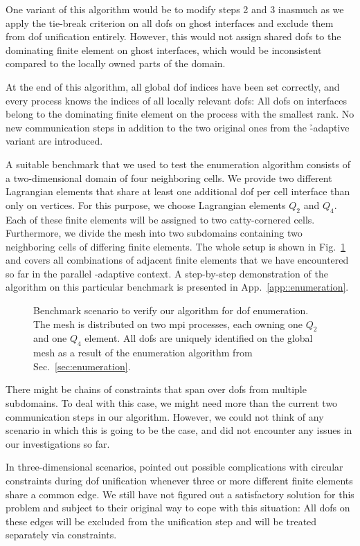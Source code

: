 One variant of this algorithm would be to modify steps 2 and 3 inasmuch as we apply the tie-break criterion on all \glspl{dof} on ghost interfaces and exclude them from \gls{dof} unification entirely. However, this would not assign shared \glspl{dof} to the dominating finite element on ghost interfaces, which would be inconsistent compared to the locally owned parts of the domain.

At the end of this algorithm, all global \gls{dof} indices have been set correctly, and every process knows the indices of all locally relevant \glspl{dof}: All \glspl{dof} on interfaces belong to the dominating finite element on the process with the smallest rank. No new communication steps in addition to the two original ones from the \h-adaptive variant are introduced.

A suitable benchmark that we used to test the enumeration algorithm consists of a two-dimensional domain of four neighboring cells. We provide two different Lagrangian elements that share at least one additional \gls{dof} per cell interface than only on vertices. For this purpose, we choose Lagrangian elements $Q_2$ and $Q_4$. Each of these finite elements will be assigned to two catty-cornered cells. Furthermore, we divide the mesh into two subdomains containing two neighboring cells of differing finite elements. The whole setup is shown in Fig.~\ref{fig:enumbenchmark} and covers all combinations of adjacent finite elements that we have encountered so far in the parallel \hp-adaptive context. A step-by-step demonstration of the algorithm on this particular benchmark is presented in App.~\ref{app::enumeration}.

\begin{figure}
\centering


\caption[Benchmark scenario for \gls{dof} enumeration.]{Benchmark scenario to verify our algorithm for \gls{dof} enumeration. The mesh is distributed on two \gls{mpi} processes, each owning one $Q_2$ and one $Q_4$ element. All \glspl{dof} are uniquely identified on the global mesh as a result of the enumeration algorithm from Sec.~\ref{sec:enumeration}.}
\label{fig:enumbenchmark}
\end{figure}

There might be chains of constraints that span over \glspl{dof} from multiple subdomains. To deal with this case, we might need more than the current two communication steps in our algorithm. However, we could not think of any scenario in which this is going to be the case, and did not encounter any issues in our investigations so far.

In three-dimensional scenarios, \textcite[Sec.~4.6]{bangerth2009} pointed out possible complications with circular constraints during \gls{dof} unification whenever three or more different finite elements share a common edge. We still have not figured out a satisfactory solution for this problem and subject to their original way to cope with this situation: All \glspl{dof} on these edges will be excluded from the unification step and will be treated separately via constraints.